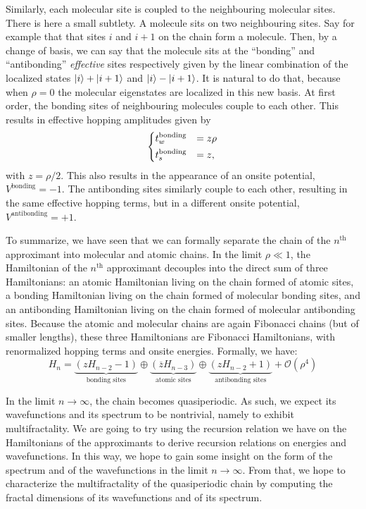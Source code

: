 \documentclass[aps,prl,preprint]{revtex4-1}
\newcommand{\zb}{\ensuremath{\overline{z}}}
\begin{document}
Similarly, each molecular site is coupled to the neighbouring molecular sites. 
There is here a small subtlety. A molecule sits on two neighbouring sites. Say for example that that sites $i$ and $i+1$ on the chain form a molecule.
Then, by a change of basis, we can say that the molecule sits at the ``bonding'' and ``antibonding'' \emph{effective} sites respectively given by the linear combination of the localized states $\ket{i} + \ket{i+1}$ and $\ket{i} - \ket{i+1}$.
It is natural to do that, because when $\rho = 0$ the molecular eigenstates are localized in this new basis.
At first order, the bonding sites of neighbouring molecules couple to each other. 
This results in effective hopping amplitudes given by
\begin{equation}
	\begin{dcases}
	t^\text{bonding}_w &= z \rho\\
	t^\text{bonding}_s &= z,
	\end{dcases}
\end{equation}
with $z = \rho/2$. This also results in the appearance of an onsite potential, $V^\text{bonding}  = -1$. 
The antibonding sites similarly couple to each other, resulting in the same effective hopping terms, but in a different onsite potential, $V^\text{antibonding} = +1$.

To summarize, we have seen that we can formally separate the chain of the $n^\text{th}$ approximant into molecular and atomic chains.
In the limit $\rho \ll 1$, the Hamiltonian of the $n^\text{th}$ approximant decouples into the direct sum of three Hamiltonians: an atomic Hamiltonian living on the chain formed of atomic sites, a bonding Hamiltonian living on the chain formed of molecular bonding sites, and an antibonding Hamiltonian living on the chain formed of molecular antibonding sites. 
Because the atomic and molecular chains are again Fibonacci chains (but of smaller lengths), these three Hamiltonians are Fibonacci Hamiltonians, with renormalized hopping terms and onsite energies.
Formally, we have:
\begin{equation}
\label{eq:recur_ham}
	H_n = \underbrace{\left( z H_{n-2} - 1 \right)}_{\text{bonding sites}} \oplus \underbrace{\left( \zb H_{n-3} \right)}_{\text{atomic sites}} \oplus \underbrace{\left( z H_{n-2} + 1 \right)}_{\text{antibonding sites}} + \mathcal{O}(\rho^4)
\end{equation}

In the limit $n \rightarrow \infty$, the chain becomes quasiperiodic. As such, we expect its wavefunctions and its spectrum to be nontrivial, namely to exhibit multifractality.
We are going to try using the recursion relation we have on the Hamiltonians of the approximants to derive recursion relations on energies and wavefunctions. In this way, we hope to gain some insight on the form of the spectrum and of the wavefunctions in the limit $n \rightarrow \infty$.
From that, we hope to characterize the multifractality of the quasiperiodic chain by computing the fractal dimensions of its wavefunctions and of its spectrum.
\end{document}
